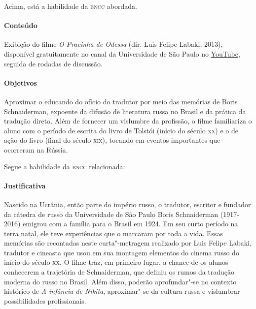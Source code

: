 \documentclass[11pt]{extarticle}
\begin{document}

Acima, está a habilidade da \textsc{bncc} abordada.

\paragraph{Conteúdo}
Exibição do filme \emph{O Pracinha de Odessa} (dir. Luis Felipe Labaki,
2013), disponível gratuitamente no canal da Universidade de São Paulo no
\href{https://www.youtube.com/watch?v=cXGSb7dsWo8}{YouTube}, seguida de rodadas de discussão.

\paragraph{Objetivos}
Aproximar o educando do ofício do tradutor por meio das memórias de
Boris Schnaiderman, expoente da difusão de literatura russa no Brasil e
da prática da tradução direta. Além de fornecer um vislumbre da
profissão, o filme familiariza o aluno com o período de escrita do livro
de Tolstói (início do século \textsc{xx}) e o de ação do livro (final do século
\textsc{xix}), tocando em eventos importantes que ocorreram na Rússia.

Segue a habilidade da \textsc{bncc} relacionada:


\paragraph{Justificativa}
Nascido na Ucrânia, então parte do império russo, o tradutor, escritor e
fundador da cátedra de russo da Universidade de São Paulo Boris
Schnaiderman (1917-2016) emigrou com a família para o Brasil em 1924. Em
seu curto período na terra natal, ele teve experiências que o marcaram
por toda a vida. Essas memórias são recontadas neste curta"-metragem
realizado por Luis Felipe Labaki, tradutor e cineasta que usou em sua
montagem elementos do cinema russo do início do século \textsc{xx}. O filme traz,
em primeiro lugar, a chance de os alunos conhecerem a trajetória de
Schnaiderman, que definiu os rumos da tradução moderna do russo no
Brasil. Além disso, poderão aprofundar"-se no contexto histórico de
\emph{A infância de Nikita}, aproximar"-se da cultura russa e vislumbrar
possibilidades profissionais.


\end{document}
